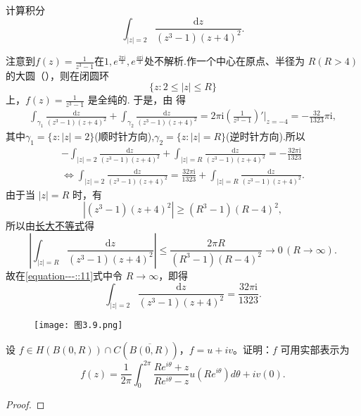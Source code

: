 \documentclass[../../main.tex]{subfiles}
\begin{document}
\begin{example}
计算积分
\[
\int_{|z| = 2} \frac{\mathrm{d}z}{(z^3 - 1)(z + 4)^2}.
\]
\end{example}
\begin{solution}
注意到\( f(z) = \frac{1}{z^3 - 1} \)在$1,e^{\frac{2\pi \mathrm{i}}{3}},e^{\frac{4\pi \mathrm{i}}{3}}$处不解析.作一个中心在原点、半径为 \( R(R > 4) \) 的大圆（），则在闭圆环
\[
\{z: 2 \leqslant |z| \leqslant R\}
\]
上，\( f(z) = \frac{1}{z^3 - 1} \) 是全纯的. 于是，由 得
\begin{align*}
\int_{\gamma_1} \frac{\mathrm{d}z}{(z^3 - 1)(z + 4)^2} + \int_{\gamma_2} \frac{\mathrm{d}z}{(z^3 - 1)(z + 4)^2} 
= 2\pi \mathrm{i} \left( \frac{1}{z^3 - 1} \right)' \bigg|_{z = -4} = -\frac{32}{1323}\pi \mathrm{i},
\end{align*}
其中$\gamma_1=\{z:|z|=2\}$(顺时针方向),$\gamma_2=\{z:|z|=R\}$(逆时针方向).所以
\begin{align}
-\int_{|z|=2}{\frac{\mathrm{d}z}{(z^3-1)(z+4)^2}}+\int_{|z|=R}{\frac{\mathrm{d}z}{(z^3-1)(z+4)^2}}=-\frac{32\pi \mathrm{i}}{1323} \nonumber
\\
\Longleftrightarrow \int_{|z|=2}{\frac{\mathrm{d}z}{(z^3-1)(z+4)^2}}=\frac{32\pi \mathrm{i}}{1323}+\int_{|z|=R}{\frac{\mathrm{d}z}{(z^3-1)(z+4)^2}}.\label{equation---::11}
\end{align}
由于当 \( |z| = R \) 时，有
\[
|(z^3 - 1)(z + 4)^2| \geqslant (R^3 - 1)(R - 4)^2,
\]
所以由\hyperref[proposition:长大不等式]{长大不等式}得
\[
\left| \int_{|z| = R} \frac{\mathrm{d}z}{(z^3 - 1)(z + 4)^2} \right| \leqslant \frac{2\pi R}{(R^3 - 1)(R - 4)^2} \to 0 \, (R \to \infty).
\]
故在\eqref{equation---::11}式中令 \( R \to \infty \)，即得
\[
\int_{|z| = 2} \frac{\mathrm{d}z}{(z^3 - 1)(z + 4)^2} = \frac{32\pi \mathrm{i}}{1323}.
\]
\begin{figure}[H]
\centering
\texttt{[image: 图3.9.png]}
\caption{}
\label{figure:图3.9}
\end{figure}
\end{solution}

\begin{theorem}[Schwarz积分公式]\label{theorem:Schwarz积分公式}
设 \( f \in H(B(0,R)) \cap C(\overline{B(0,R)}) \)，\( f = u + iv \)。证明：\( f \) 可用实部表示为
\[
f(z) = \frac{1}{2\pi} \int_{0}^{2\pi} \frac{Re^{i\theta} + z}{Re^{i\theta} - z} u(Re^{i\theta}) d\theta + iv(0).
\]
\end{theorem}
\begin{proof}

\end{proof}
\end{document}
